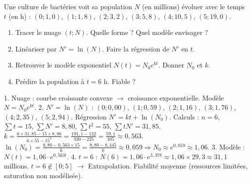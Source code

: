 \documentclass[11pt]{article}
\begin{document}
\begin{exercice}
Une culture de bactéries voit sa population $N$ (en millions) évoluer avec le temps $t$ (en h) :
$(0 ; 1,0)$, $(1 ; 1,8)$, $(2 ; 3,2)$, $(3 ; 5,8)$, $(4 ; 10,5)$, $(5 ; 19,0)$.
\begin{enumerate}
\item Tracer le nuage $(t ; N)$. Quelle forme ? Quel modèle envisager ?
\item Linéariser par $N' = \ln(N)$. Faire la régression de $N'$ en $t$.
\item Retrouver le modèle exponentiel $N(t) = N_0 e^{kt}$. Donner $N_0$ et $k$.
\item Prédire la population à $t = 6$ h. Fiable ?
\end{enumerate}
\end{exercice}

\begin{corrige}
1. Nuage : courbe croissante convexe $\rightarrow$ croissance exponentielle. Modèle $N = N_0 e^{kt}$.
2. $N' = \ln(N)$ : $(0 ; 0,00)$, $(1 ; 0,59)$, $(2 ; 1,16)$, $(3 ; 1,76)$, $(4 ; 2,35)$, $(5 ; 2,94)$.
Régression $N' = kt + \ln(N_0)$.
Calculs : $n=6$, $\sum t=15$, $\sum N'=8,80$, $\sum t^2=55$, $\sum tN'=31,85$.
$k = \frac{6\times 31,85 - 15\times 8,80}{6\times 55 - 15^2} = \frac{191,1 - 132}{330 - 225} = \frac{59,1}{105} \approx 0,563$.
$\ln(N_0) = \frac{8,80 - 0,563\times 15}{6} = \frac{8,80 - 8,445}{6} \approx 0,059 \Rightarrow N_0 \approx e^{0,059} \approx 1,06$.
3. Modèle : $\boxed{N(t) = 1,06 \cdot e^{0,563 t}}$.
4. $t=6$ : $N(6) = 1,06 \cdot e^{3,378} \approx 1,06 \times 29,3 \approx 31,1$ millions.
$t=6 \notin [0;5]$ $\rightarrow$ Extrapolation. Fiabilité moyenne (ressources limitées, saturation non modélisée).
\end{corrige}
\end{document}
